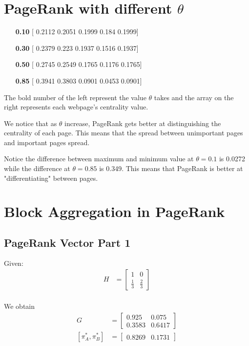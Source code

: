 \documentclass[]{article}
\begin{document}
\newpage
\section{PageRank with different $\theta$}

\begin{enumerate}
	\item[\textbf{0.10}] [ 0.2112  0.2051  0.1999  0.184   0.1999]
	\item[\textbf{0.30}] [ 0.2379  0.223   0.1937  0.1516  0.1937]
	\item[\textbf{0.50}] [ 0.2745  0.2549  0.1765  0.1176  0.1765]
	\item[\textbf{0.85}] [ 0.3941  0.3803  0.0901  0.0453  0.0901]
\end{enumerate}

The bold number of the left represent the value $\theta$ takes and the array on the right represents each webpage's centrality value.

We notice that as $\theta$ increase, PageRank gets better at distinguishing the centrality of each page. This means that the spread between unimportant pages and important pages spread.

Notice the difference between maximum and minimum value at $\theta=0.1$ is 0.0272 while the difference at $\theta=0.85$ is 0.349. This means that PageRank is better at "differentiating" between pages.


\newpage
\section{Block Aggregation in PageRank}

\subsection{PageRank Vector Part 1}

Given:
\begin{align*}
	H &= \begin{bmatrix}
	1 & 0 \\
	\frac{1}{3} & \frac{2}{3}
	\end{bmatrix} \\
\end{align*}

We obtain
\begin{align*}
	G &= 
	\begin{bmatrix}
		0.925 & 0.075 \\
		0.3583 & 0.6417
	\end{bmatrix} \\
	[\pi_A^*, \pi_B^* ] &= 
	\begin{bmatrix}
		0.8269 & 0.1731
	\end{bmatrix}
\end{align*}
\end{document}
